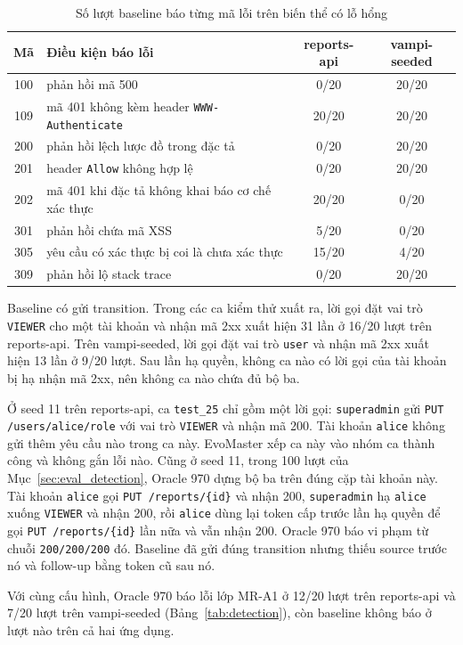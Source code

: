 \begin{table}[htbp]
  \centering
  \caption{Số lượt baseline báo từng mã lỗi trên biến thể có lỗ hổng}
  \label{tab:upstream_faults}
  \begin{tabularx}{\textwidth}{@{}c >{\raggedright\arraybackslash}X c c@{}}
    \toprule
    \textbf{Mã} & \textbf{Điều kiện báo lỗi} & \textbf{reports-api} & \textbf{vampi-seeded} \\
    \midrule
    100 & phản hồi mã 500 & 0/20 & 20/20 \\
    109 & mã 401 không kèm header \texttt{WWW-Authenticate} & 20/20 & 20/20 \\
    200 & phản hồi lệch lược đồ trong đặc tả & 0/20 & 20/20 \\
    201 & header \texttt{Allow} không hợp lệ & 0/20 & 20/20 \\
    202 & mã 401 khi đặc tả không khai báo cơ chế xác thực & 20/20 & 0/20 \\
    301 & phản hồi chứa mã XSS & 5/20 & 0/20 \\
    305 & yêu cầu có xác thực bị coi là chưa xác thực & 15/20 & 4/20 \\
    309 & phản hồi lộ stack trace & 0/20 & 20/20 \\
    \bottomrule
  \end{tabularx}
\end{table}

Baseline có gửi transition. Trong các ca kiểm thử xuất ra, lời gọi đặt vai trò \texttt{VIEWER} cho một tài khoản và nhận mã 2xx xuất hiện 31 lần ở 16/20 lượt trên reports-api. Trên vampi-seeded, lời gọi đặt vai trò \texttt{user} và nhận mã 2xx xuất hiện 13 lần ở 9/20 lượt. Sau lần hạ quyền, không ca nào có lời gọi của tài khoản bị hạ nhận mã 2xx, nên không ca nào chứa đủ bộ ba.

Ở seed 11 trên reports-api, ca \texttt{test\_25} chỉ gồm một lời gọi: \texttt{superadmin} gửi \texttt{PUT /users/alice/role} với vai trò \texttt{VIEWER} và nhận mã 200. Tài khoản \texttt{alice} không gửi thêm yêu cầu nào trong ca này. EvoMaster xếp ca này vào nhóm ca thành công và không gắn lỗi nào. Cũng ở seed 11, trong 100 lượt của Mục~\ref{sec:eval_detection}, Oracle 970 dựng bộ ba trên đúng cặp tài khoản này. Tài khoản \texttt{alice} gọi \texttt{PUT /reports/\{id\}} và nhận 200, \texttt{superadmin} hạ \texttt{alice} xuống \texttt{VIEWER} và nhận 200, rồi \texttt{alice} dùng lại token cấp trước lần hạ quyền để gọi \texttt{PUT /reports/\{id\}} lần nữa và vẫn nhận 200. Oracle 970 báo vi phạm từ chuỗi \texttt{200/200/200} đó. Baseline đã gửi đúng transition nhưng thiếu source trước nó và follow-up bằng token cũ sau nó.

Với cùng cấu hình, Oracle 970 báo lỗi lớp \mbox{MR-A1} ở 12/20 lượt trên reports-api và 7/20 lượt trên vampi-seeded (Bảng~\ref{tab:detection}), còn baseline không báo ở lượt nào trên cả hai ứng dụng.

\endgroup
